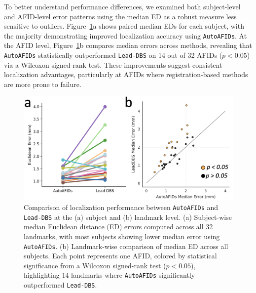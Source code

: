 To better understand performance differences, we examined both subject-level and AFID-level error patterns using the median ED as a robust measure less sensitive to outliers. Figure~\ref{fig:ch3_Figure_cnnvslead2}a shows paired median EDs for each subject, with the majority demonstrating improved localization accuracy using \texttt{AutoAFIDs}. At the AFID level, Figure~\ref{fig:ch3_Figure_cnnvslead2}b compares median errors across methods, revealing that \texttt{AutoAFIDs} statistically outperformed \texttt{Lead-DBS} on 14 out of 32 AFIDs (\(p < 0.05\)) via a Wilcoxon signed-rank test. These improvements suggest consistent localization advantages, particularly at AFIDs where registration-based methods are more prone to failure.

\begin{figure}[hbt!]
    \centering
    \includegraphics[width=1\linewidth]{figs/ch3_Figure_cnnvslead2.png}
    \caption{Comparison of localization performance between \texttt{AutoAFIDs} and \texttt{Lead-DBS} at the (a) subject and (b) landmark level. (a) Subject-wise median Euclidean distance (ED) errors computed across all 32 landmarks, with most subjects showing lower median error using \texttt{AutoAFIDs}. (b) Landmark-wise comparison of median ED across all subjects. Each point represents one AFID, colored by statistical significance from a Wilcoxon signed-rank test (\(p < 0.05\)), highlighting 14 landmarks where \texttt{AutoAFIDs} significantly outperformed \texttt{Lead-DBS}.}
    \label{fig:ch3_Figure_cnnvslead2}
\end{figure}

